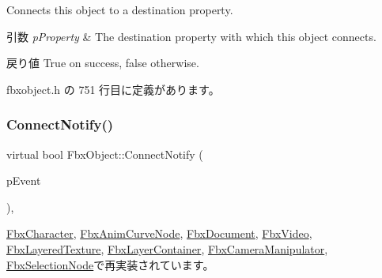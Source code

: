 Connects this object to a destination property. 
\begin{DoxyParams}{引数}
{\em p\+Property} & The destination property with which this object connects. \\
\hline
\end{DoxyParams}
\begin{DoxyReturn}{戻り値}
{\ttfamily True} on success, {\ttfamily false} otherwise. 
\end{DoxyReturn}


 fbxobject.\+h の 751 行目に定義があります。

\mbox{\label{class_fbx_object_ab7a400f3829d1f0da57d3d78c8168dd0}} 
\subsubsection{\texorpdfstring{Connect\+Notify()}{ConnectNotify()}}
{\footnotesize\ttfamily virtual bool Fbx\+Object\+::\+Connect\+Notify (\begin{DoxyParamCaption}\item[{const \hyperlink{class_fbx_connect_event}{Fbx\+Connect\+Event} \&}]{p\+Event }\end{DoxyParamCaption})\hspace{0.3cm}{\ttfamily [protected]}, {\ttfamily [virtual]}}



\hyperlink{class_fbx_character_a42e5f6d72c0669b6eedf0cb511720845}{Fbx\+Character}, \hyperlink{class_fbx_anim_curve_node_a0a3743b600796ab2b87dea299654b98c}{Fbx\+Anim\+Curve\+Node}, \hyperlink{class_fbx_document_a7c3b910b2d44729973266e32733da3fb}{Fbx\+Document}, \hyperlink{class_fbx_video_afb1d8565917f33ab3777ac9e07b21cd0}{Fbx\+Video}, \hyperlink{class_fbx_layered_texture_a78ed9cd6298697060ebc278617d72d44}{Fbx\+Layered\+Texture}, \hyperlink{class_fbx_layer_container_a7fe50204f62a2d4db056cc730c1eba18}{Fbx\+Layer\+Container}, \hyperlink{class_fbx_camera_manipulator_a0cd75ec4a78ef84f2cf10f750e4491c6}{Fbx\+Camera\+Manipulator}, \hyperlink{class_fbx_selection_node_acf8e30df7df84c4fbff9c12f64a2b3fe}{Fbx\+Selection\+Node}で再実装されています。

\mbox{\label{class_fbx_object_a1c75d466c5166486787bfa06b4fd221f}} 
